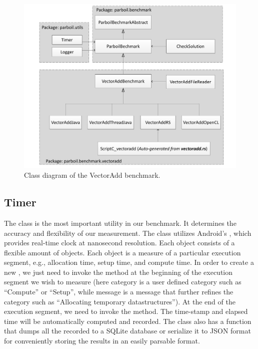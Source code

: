 \begin{figure}[t!]
\centering
\includegraphics[scale=0.5]{figs/vectoradd_class_diagram.pdf}
\caption{Class diagram of the VectorAdd benchmark.}
\label{fig:class_diagram}
\centering
\end{figure}

\subsection*{Timer}
The  class is the most important utility in our benchmark. It
determines the accuracy and flexibility of our measurement. The 
class utilizes Android's , which provides real-time clock at
nanosecond resolution. Each  object consists of a flexible amount of
 objects. Each  object is a measure of a
particular execution segment, e.g., allocation time, setup time, and compute
time. In order to create a new , we just need to invoke the
 method at the beginning of the execution
segment we wish to measure (here category is a user defined category such as
``Compute'' or ``Setup'', while message is a message that further refines the
category such as ``Allocating temporary datastructures''). At the end of the
execution segment, we need to invoke the  method. The
time-stamp and elapsed time will be automatically computed and recorded. The
 class also has a function that dumps all the recorded
 to a SQLite database or serialize it to JSON format for
conveniently storing the results in an easily parsable format.

